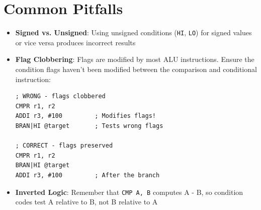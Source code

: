 \section{Common Pitfalls}

\begin{itemize}
	\item \textbf{Signed vs. Unsigned}: Using unsigned conditions (\texttt{HI}, \texttt{LO}) for signed values or vice versa produces incorrect results

	\item \textbf{Flag Clobbering}: Flags are modified by most ALU instructions. Ensure the condition flags haven't been modified between the comparison and conditional instruction:

	      \begin{lstlisting}
; WRONG - flags clobbered
CMPR r1, r2
ADDI r3, #100         ; Modifies flags!
BRAN|HI @target       ; Tests wrong flags

; CORRECT - flags preserved
CMPR r1, r2
BRAN|HI @target
ADDI r3, #100         ; After the branch
\end{lstlisting}

	\item \textbf{Inverted Logic}: Remember that \texttt{CMP A, B} computes A - B, so condition codes test A relative to B, not B relative to A
\end{itemize}
